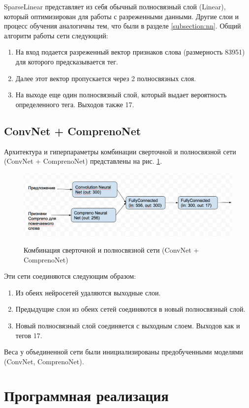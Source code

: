 SparseLinear представляет из себя обычный полносвязный слой (Linear), который
оптимизирован для работы с разреженными данными. Другие слои и процесс обучения
аналогичны тем, что были в разделе \ref{subsection:nn}.
Общий алгоритм работы сети следующий:
\begin{enumerate}
  \item На вход подается разреженный вектор признаков слова (размерность 83951) для которого предсказывается тег.
  \item Далее этот вектор пропускается через 2 полносвязных слоя.
  \item На выходе еще один полносвязный слой, который выдает вероятность определенного тега.
  Выходов также 17.
\end{enumerate}

\subsection{ConvNet + ComprenoNet}

Архитектура и гиперпараметры комбинации сверточной и полносвязной сети (ConvNet + ComprenoNet)
представлены на рис. \ref{figure:two_net}.
\begin{figure}[!h]
  \centering
  \caption{Комбинация сверточной и полносвязной сети (ConvNet + ComprenoNet)}
  \includegraphics[scale=0.5]{figures/two-net.png}
  \label{figure:two_net}
\end{figure}
Эти сети соединяются следующим образом:
\begin{enumerate}
  \item Из обеих нейросетей удаляются выходные слои.
  \item Предыдущие слои из обеих сетей соединяются в новый полносвязный слой.
  \item Новый полносвязный слой соединяется с выходным слоем. Выходов как и тегов 17.
\end{enumerate}
Веса у объединенной сети были инициализированы предобученными моделями (ConvNet, ComprenoNet).

\section{Программная реализация}

